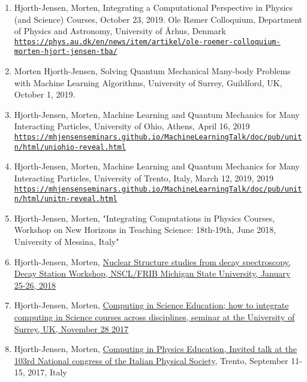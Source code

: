 \documentclass[%
oneside,                 %
final,                   %
10pt]{article}
\begin{document}
\begin{enumerate}
\item Hjorth-Jensen, Morten, Integrating a Computational Perspective in Physics (and Science) Courses, October 23, 2019. Ole Rømer Colloquium, Department of Physics and Astronomy, University of Århus, Denmark \href{{https://phys.au.dk/en/news/item/artikel/ole-roemer-colloquium-morten-hjort-jensen-tba/}}{\nolinkurl{https://phys.au.dk/en/news/item/artikel/ole-roemer-colloquium-morten-hjort-jensen-tba/}}

\item Morten Hjorth-Jensen, Solving Quantum Mechanical Many-body Problems with Machine Learning Algorithms, University of Surrey, Guildford, UK, October 1, 2019.

\item Hjorth-Jensen, Morten, Machine Learning and Quantum Mechanics for Many Interacting Particles, University of Ohio, Athens, April 16, 2019  \href{{https://mhjensenseminars.github.io/MachineLearningTalk/doc/pub/unitn/html/uniohio-reveal.html}}{\nolinkurl{https://mhjensenseminars.github.io/MachineLearningTalk/doc/pub/unitn/html/uniohio-reveal.html}}

\item Hjorth-Jensen, Morten, Machine Learning and Quantum Mechanics for Many Interacting Particles, University of Trento, Italy, March 12, 2019, 2019  \href{{https://mhjensenseminars.github.io/MachineLearningTalk/doc/pub/unitn/html/unitn-reveal.html}}{\nolinkurl{https://mhjensenseminars.github.io/MachineLearningTalk/doc/pub/unitn/html/unitn-reveal.html}}

\item Hjorth-Jensen, Morten, "Integrating Computations in Physics Courses, Workshop on New Horizons in Teaching Science: 18th-19th, June 2018, University of Messina, Italy"

\item Hjorth-Jensen, Morten, \href{{https://indico.fnal.gov/event/15794/page/11}}{Nuclear Structure studies from decay spectroscopy, Decay Station Workshop, NSCL/FRIB Michigan State University, January 25-26, 2018}

\item Hjorth-Jensen, Morten, \href{{http://www.nucleartheory.net/NPG/recent_seminars.htm}}{Computing in Science Education; how to integrate computing in Science courses across disciplines, seminar at the University of Surrey, UK, November 28 2017}

\item Hjorth-Jensen, Morten, \href{{https://www.sif.it/attivita/congresso/103}}{Computing in Physics Education, Invited talk at the 103rd National congress of the Italian Physical Society}, Trento, September 11-15, 2017, Italy


\end{enumerate}
\end{document}

